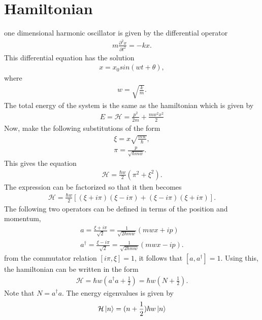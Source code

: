 \documentclass[12pt]{article}
\begin{document}
\section{Hamiltonian}
one dimensional harmonic oscillator is given by the differential operator
\begin{gather}
m \frac{\partial^2 x}{\partial t^2} = -kx.
\end{gather}
This differential equation has the solution
\begin{gather}
x=x_0 sin(wt + \theta),
\end{gather}
where
\begin{gather}
w=\sqrt{\frac{k}{m}}.
\end{gather}
The total energy of the system is the same as the hamiltonian which is given by
\begin{gather}
E = \mathcal{H} = \frac{p^2}{2m} + \frac{mw^2x^2}{2}
\end{gather}
Now, make the following substitutions of the form 
\begin{gather}
\xi = x \sqrt{\frac{mw}{\hbar}}, \\
\pi = \frac{p}{\sqrt{\hbar mw}}. 
\end{gather}
This gives the equation
\begin{gather}
\mathcal{H} = \frac{\hbar w}{2}(\pi^2+\xi^2).
\end{gather}
The expression can be factorized so that it then becomes
\begin{gather}
\mathcal{H} = \frac{\hbar w}{2}[(\xi + i \pi)(\xi - i \pi) + (\xi - i \pi)(\xi + i \pi)].
\end{gather}
The following two operators can be defined in terms of the position and momentum, 
\begin{gather}
a = \frac{\xi + i \pi}{\sqrt{2}} = \frac{1}{\sqrt{2 \hbar m w}}(mwx + ip) \\
a^\dagger = \frac{\xi - i \pi}{\sqrt{2}} = \frac{1}{\sqrt{2 \hbar m w}}(mwx - ip).
\end{gather}
from the commutator relation $[i \pi,\xi] = 1$, it follows that $[a,a^\dagger] = 1$. Using this, the hamiltonian can be written in the form
\begin{gather}
\mathcal{H} = \hbar w (a^\dagger a + \frac{1}{2}) = \hbar w (N + \frac{1}{2}).
\label{hamil}
\end{gather}
Note that $N = a^\dagger a$. The energy eigenvalues is given by
\begin{gather}
\mathcal{H}\Ket{n} = (n+\frac{1}{2})\hbar w\Ket{n}
\end{gather}
\end{document}
